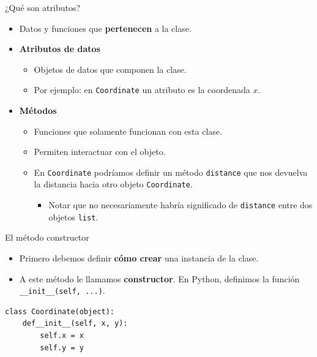\documentclass[mathserif]{beamer}
\begin{document}
\begin{frame}[fragile]{¿Qué son atributos?}
    \begin{itemize}
        \item Datos y funciones que {\orange\bfseries pertenecen} a la clase.
        \item {\orange\bfseries Atributos de datos}
        \begin{itemize}
            \item Objetos de datos que componen la clase.
            \item Por ejemplo: en \lstinline|Coordinate| un atributo es la coordenada $x$.
        \end{itemize}
        
        \item {\orange\bfseries Métodos}
        \begin{itemize}
            \item Funciones que solamente funcionan con esta clase.
            \item Permiten {\blue interactuar} con el objeto.
            \item En \lstinline|Coordinate| podríamos definir un método \lstinline|distance| que nos devuelva la distancia hacia otro objeto \lstinline|Coordinate|. 
            \begin{itemize}
                \item Notar que no necesariamente habría significado de \lstinline|distance| entre dos objetos \lstinline|list|.
            \end{itemize}
        \end{itemize}
    \end{itemize}
\end{frame}

\begin{frame}[fragile]{El método constructor}
    \begin{itemize}
        \item Primero debemos definir {\orange\bfseries cómo crear} una instancia de la clase.
        
        \item A este método le llamamos {\orange\bfseries constructor}. En Python, definimos la función \lstinline|__init__(self, ...)|.
    \end{itemize}
    
\begin{lstlisting}
class Coordinate(object):
    def__init__(self, x, y):
        self.x = x
        self.y = y
\end{lstlisting}
\end{frame}
\end{document}
